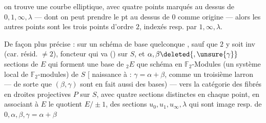 on trouve une courbe elliptique, avec quatre points marqués  au dessus de $0,1,\infty,\lambda$ --- dont on peut prendre le pt au dessus de $0$ comme origine --- alors les autres points sont les trois points d'ordre $2$, indexés resp. par $1,\infty,\lambda$.

De façon plus précise : sur un schéma de base quelconque , sauf que $2$ y soit inv (car. résid.  $\ne 2$),   foncteur qui va     ()   sur $S$, et  $\alpha,\beta\deleted{,\unsure{\gamma}}$   sections de $E$ qui forment une base de ${}_2E$  que schéma  en $\mathbb{F}_2$-Modules (un système local de $\mathbb{F}_2$-modules) de $S$ [ naissance à : $\gamma=\alpha+\beta$, comme un troisième larron --- de sorte que $(\beta,\gamma)$   sont en fait aussi des bases) --- vers la catégorie des fibrés en droites projectives $P$ sur $S$, avec quatre sections   distinctes en chaque point, en associant à $E$ le quotient $E/\pm1$,  des sections $u_0,u_1,u_\infty,\lambda$ qui sont image resp. de $0,\alpha,\beta,\gamma=\alpha+\beta$



